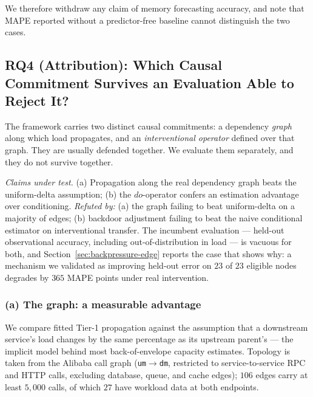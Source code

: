 \documentclass[journal, 10pt]{IEEEtran}
\begin{document}
We therefore withdraw any claim of
memory forecasting accuracy, and note that MAPE reported without a
predictor-free baseline cannot distinguish the two cases.


\subsection{RQ4 (Attribution): Which Causal Commitment Survives an Evaluation Able to Reject It?}
\label{sec:rq5}

The framework carries two distinct causal commitments: a dependency \emph{graph}
along which load propagates, and an \emph{interventional operator} defined over
that graph. They are usually defended together. We evaluate them separately, and
they do not survive together.

\emph{Claims under test.} (a) Propagation along the real dependency graph beats
the uniform-delta assumption; (b) the $do$-operator confers an estimation
advantage over conditioning. \emph{Refuted by:} (a) the graph failing to beat
uniform-delta on a majority of edges; (b) backdoor adjustment failing to beat the
naive conditional estimator on interventional transfer. The incumbent evaluation
--- held-out observational accuracy, including out-of-distribution in load --- is
vacuous for both, and Section~\ref{sec:backpressure-edge} reports the case that
shows why: a mechanism we validated as improving held-out error on $23$ of $23$
eligible nodes degrades by $365$ MAPE points under real intervention.

\subsubsection{(a) The graph: a measurable advantage}
\label{sec:rq5-graph}

We compare fitted Tier-1 propagation against the assumption that a downstream
service's load changes by the same percentage as its upstream parent's --- the
implicit model behind most back-of-envelope capacity estimates. Topology is taken
from the Alibaba call graph (\texttt{um}$\to$\texttt{dm}, restricted to
service-to-service RPC and HTTP calls, excluding database, queue, and cache
edges); $106$ edges carry at least $5{,}000$ calls, of which $27$ have workload
data at both endpoints.
\end{document}
